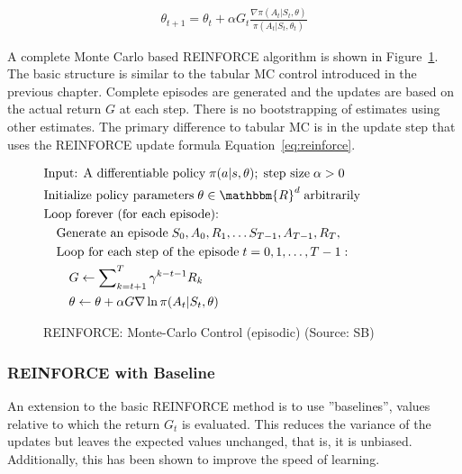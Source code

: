 \begin{align}
\theta_{t+1} = \theta_t + \alpha G_t \frac{\nabla \pi(A_t | S_t, \theta)}{\pi(A_t | S_t, \theta_t)} \label{eq:reinforce}
\end{align}

A complete Monte Carlo based REINFORCE algorithm is shown in Figure~\ref{fig:reinforce}. The basic structure is similar to the tabular MC control introduced in the previous chapter. Complete episodes are generated and the updates are based on the actual return $G$ at each step. There is no bootstrapping of estimates using other estimates. The primary difference to tabular MC is in the update step that uses the REINFORCE update formula Equation~\ref{eq:reinforce}.

\begin{figure}
\small
\begin{tcolorbox}[colback=code]
\vspace{-\baselineskip}
\begin{align*}
& \text{Input: A differentiable policy}\;\pi(a | s, \theta);\;\text{step size}\; \alpha > 0 \\
& \text{Initialize policy parameters}\; \theta \in \mathbbm{R}^d\;\text{arbitrarily} \\
& \text{Loop forever (for each episode):} \\
& \quad \text{Generate an episode}\; S_0, A_0, R_1, \ldots S_{T-1}, A_{T-1}, R_T, \hspace{1in} \\
& \quad \text{Loop for each step of the episode}\;t=0, 1, \ldots, T-1:\\
& \quad \quad G \leftarrow \sum\nolimits_{k=t+1}^T \gamma^{k - t - 1}R_k \\
& \quad \quad \theta \leftarrow \theta + \alpha G \nabla \ln \pi(A_t | S_t, \theta)
\end{align*}
\end{tcolorbox}
\caption[REINFORCE: Monte-Carlso Control]{REINFORCE: Monte-Carlo Control (episodic) (Source: SB)}
\label{fig:reinforce}
\end{figure}

\subsubsection*{REINFORCE with Baseline}

An extension to the basic REINFORCE method is to use ''baselines'', values relative to which the return $G_t$ is evaluated. This reduces the variance of the updates but leaves the expected values unchanged, that is, it is unbiased. Additionally, this has been shown to improve the speed of learning. 

